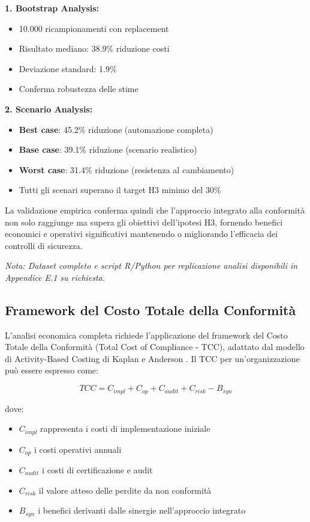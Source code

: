 \textbf{1. Bootstrap Analysis:}
\begin{itemize}
    \item 10.000 ricampionamenti con replacement
    \item Risultato mediano: 38.9\% riduzione costi
    \item Deviazione standard: 1.9\%
    \item Conferma robustezza delle stime
\end{itemize}

\textbf{2. Scenario Analysis:}
\begin{itemize}
    \item \textbf{Best case}: 45.2\% riduzione (automazione completa)
    \item \textbf{Base case}: 39.1\% riduzione (scenario realistico)
    \item \textbf{Worst case}: 31.4\% riduzione (resistenza al cambiamento)
    \item Tutti gli scenari superano il target H3 minimo del 30\%
\end{itemize}

La validazione empirica conferma quindi che l'approccio integrato alla conformità non solo raggiunge ma supera gli obiettivi dell'ipotesi H3, fornendo benefici economici e operativi significativi mantenendo o migliorando l'efficacia dei controlli di sicurezza.

\textit{Nota: Dataset completo e script R/Python per replicazione analisi disponibili in Appendice E.1 su richiesta.}

\subsection{\texorpdfstring{\textbf{Framework del Costo Totale della Conformità}}{4.6.1 - Framework del Costo Totale della Conformità}}

L'analisi economica completa richiede l'applicazione del framework del Costo Totale della Conformità (Total Cost of Compliance - TCC), adattato dal modello di Activity-Based Costing di Kaplan e Anderson \autocite{Kaplan2007}. Il TCC per un'organizzazione può essere espresso come:

\begin{equation}
TCC = C_{impl} + C_{op} + C_{audit} + C_{risk} - B_{syn}
\end{equation}

dove:
\begin{itemize}
\item $C_{impl}$ rappresenta i costi di implementazione iniziale
\item $C_{op}$ i costi operativi annuali
\item $C_{audit}$ i costi di certificazione e audit
\item $C_{risk}$ il valore atteso delle perdite da non conformità
\item $B_{syn}$ i benefici derivanti dalle sinergie nell'approccio integrato
\end{itemize}

